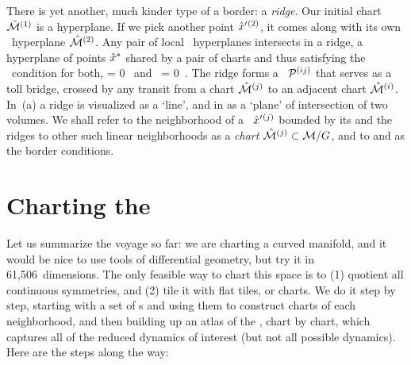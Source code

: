 \documentclass[aip,cha,reprint,
secnumarabic,
nofootinbib, tightenlines,
nobibnotes, showkeys, showpacs,
groupedaddress
]{revtex4-1}
\begin{document}
There is yet another, much kinder type of a border: a \emph{ridge}. Our
initial chart $\hat{\cal M}{}^{(1)}$ is a  hyperplane. If we
pick another {\template} point ${\hat{x}'}{}^{(2)}$, it comes along with its
own \slice\ hyperplane $\hat{\cal M}{}^{(2)}$. Any pair of 
local \slice\ hyperplanes intersects in a {ridge}, a 
hyperplane {\PoincS} of points $\hat{x}^*$ shared by a pair of charts and
thus satisfying the \slice\ condition  for both,
\beq
{} = 0
\mbox{ and }
 = 0
    \,.
The ridge forms a \PoincSec\ ${\cal P}{}^{(ij)}$ that serves as
a toll bridge, crossed by any transit from a chart $\hat{\cal M}{}^{(j)}$ to an
adjacent chart $\hat{\cal M}{}^{(i)}$.
In \,(a) a ridge is visualized as a `line', and
in  as a `plane' of intersection of two volumes.
We shall refer to the neighborhood of a \template\ ${\hat{x}'}{}^{(j)}$
bounded by its {\chartBord} and the ridges to other such linear
neighborhoods as a \emph{chart} $\hat{\cal M}{}^{(j)} \subset {\cal M}/G$, and
to  and  as the {border conditions}.

\section{Charting the \slice}
\label{s:chart}

Let us summarize the voyage so far: we are charting a curved manifold,
and it would be nice to use tools of differential geometry, but try it in
61,506~dimensions. The only feasible way to chart this space is to (1)
quotient all continuous symmetries, and (2) tile it with flat
 tiles, or charts. We do it step by step,
starting with a set of \template s and using them to construct charts of
each neighborhood, and then building up an atlas of the \emph{\slice},
chart by chart, which captures all of the reduced dynamics of interest
(but not all possible dynamics). Here are the steps along the way:
\end{document}
